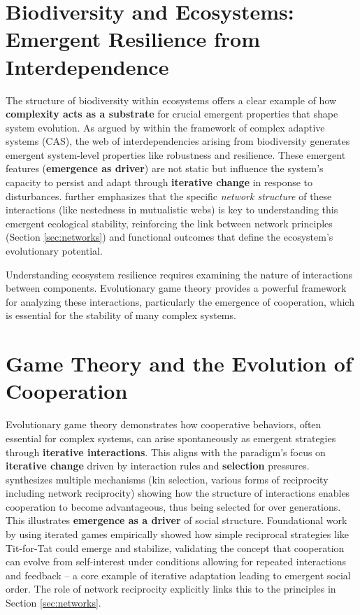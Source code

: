 \section{Biodiversity and Ecosystems: Emergent Resilience from Interdependence} \label{sec:biodiversity}
The structure of biodiversity within ecosystems offers a clear example of how \textbf{complexity acts as a substrate} for crucial emergent properties that shape system evolution. As argued by \citet{sole2022complex} within the framework of complex adaptive systems (CAS), the web of interdependencies arising from biodiversity generates emergent system-level properties like robustness and resilience. These emergent features (\textbf{emergence as driver}) are not static but influence the system's capacity to persist and adapt through \textbf{iterative change} in response to disturbances. \citet{bascompte2009disentangling} further emphasizes that the specific \emph{network structure} of these interactions (like nestedness in mutualistic webs) is key to understanding this emergent ecological stability, reinforcing the link between network principles (Section \ref{sec:networks}) and functional outcomes that define the ecosystem's evolutionary potential.

Understanding ecosystem resilience requires examining the nature of interactions between components. Evolutionary game theory provides a powerful framework for analyzing these interactions, particularly the emergence of cooperation, which is essential for the stability of many complex systems.

\section{Game Theory and the Evolution of Cooperation} \label{sec:game_theory}
Evolutionary game theory demonstrates how cooperative behaviors, often essential for complex systems, can arise spontaneously as emergent strategies through \textbf{iterative interactions}. This aligns with the paradigm's focus on \textbf{iterative change} driven by interaction rules and \textbf{selection} pressures. \citet{nowak2006five} synthesizes multiple mechanisms (kin selection, various forms of reciprocity including network reciprocity) showing how the structure of interactions enables cooperation to become advantageous, thus being selected for over generations. This illustrates \textbf{emergence as a driver} of social structure. Foundational work by \citet{axelrod1981evolution} using iterated games empirically showed how simple reciprocal strategies like Tit-for-Tat could emerge and stabilize, validating the concept that cooperation can evolve from self-interest under conditions allowing for repeated interactions and feedback – a core example of iterative adaptation leading to emergent social order. The role of network reciprocity explicitly links this to the principles in Section \ref{sec:networks}.

